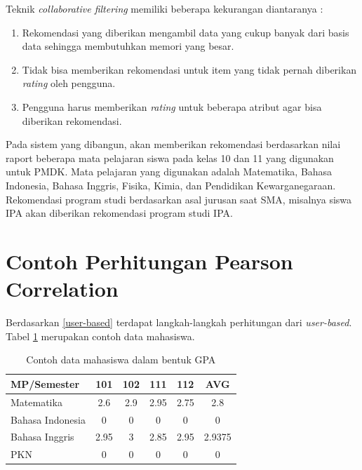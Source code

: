 Teknik \textit{collaborative filtering} memiliki beberapa kekurangan diantaranya : 

\begin{enumerate}
    \item Rekomendasi yang diberikan mengambil data yang cukup banyak dari basis data sehingga membutuhkan memori yang besar.
    
    \item Tidak bisa memberikan rekomendasi untuk item yang tidak pernah diberikan \textit{rating} oleh pengguna.
    
    \item Pengguna harus memberikan \textit{rating} untuk beberapa atribut agar bisa diberikan rekomendasi.
    
\end{enumerate}

Pada sistem yang dibangun, akan memberikan rekomendasi berdasarkan nilai raport beberapa mata pelajaran siswa pada kelas 10 dan 11 yang digunakan untuk PMDK. Mata pelajaran yang digunakan adalah Matematika, Bahasa Indonesia, Bahasa Inggris, Fisika, Kimia, dan Pendidikan Kewarganegaraan. Rekomendasi program studi berdasarkan asal jurusan saat SMA, misalnya siswa IPA akan diberikan rekomendasi program studi IPA.


\section{Contoh Perhitungan Pearson Correlation}
Berdasarkan \ref{user-based} terdapat langkah-langkah perhitungan dari \textit{user-based}. Tabel \ref{tab:data mahasswa} merupakan contoh data mahasiswa.

\begin{table}[H]
    \centering
    \renewcommand{\arraystretch}{1.5}
    \begin{tabular}{|l|c|c|c|c|c|}
        \hline
        MP\slash Semester & 101 & 102 & 111 & 112 & AVG \\
        \hline 
        Matematika & 2.6 & 2.9 & 2.95 & 2.75 & 2.8 \\
        \hline 
        Bahasa Indonesia & 0 & 0 & 0 & 0 & 0 \\
        \hline 
        Bahasa Inggris & 2.95 & 3 & 2.85 & 2.95 & 2.9375 \\
        \hline 
        PKN & 0 & 0 & 0 & 0 & 0 \\
        \hline
    \end{tabular}
    \caption{Contoh data mahasiswa dalam bentuk GPA}
	\label{tab:data mahasswa}
\end{table}

